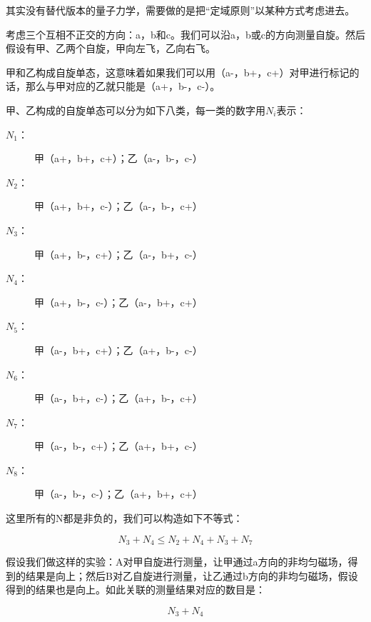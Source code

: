 其实没有替代版本的量子力学，需要做的是把“定域原则”以某种方式考虑进去。

考虑三个互相不正交的方向：a，b和c。我们可以沿a，b或c的方向测量自旋。然后假设有甲、乙两个自旋，甲向左飞，乙向右飞。

甲和乙构成自旋单态，这意味着如果我们可以用（a-，b+，c+）对甲进行标记的话，那么与甲对应的乙就只能是（a+，b-，c-）。

甲、乙构成的自旋单态可以分为如下八类，每一类的数字用$N_i$表示：

\begin{description}
\item[$N_1$：] 

甲（a+，b+，c+）；乙（a-，b-，c-）

\item[$N_2$：]

甲（a+，b+，c-）；乙（a-，b-，c+）

\item[$N_3$：]

甲（a+，b-，c+）；乙（a-，b+，c-）

\item[$N_4$：]

甲（a+，b-，c-）；乙（a-，b+，c+）

\item[$N_5$：]

甲（a-，b+，c+）；乙（a+，b-，c-）

\item[$N_6$：]

甲（a-，b+，c-）；乙（a+，b-，c+）

\item[$N_7$：]

甲（a-，b-，c+）；乙（a+，b+，c-）

\item[$N_8$：]

甲（a-，b-，c-）；乙（a+，b+，c+）

\end{description}

这里所有的N都是非负的，我们可以构造如下不等式：

\begin{equation}
N_3 + N_4 \le N_2 + N_4 + N_3 + N_7
\end{equation}

假设我们做这样的实验：A对甲自旋进行测量，让甲通过a方向的非均匀磁场，得到的结果是向上；然后B对乙自旋进行测量，让乙通过b方向的非均匀磁场，假设得到的结果也是向上。如此关联的测量结果对应的数目是：

\begin{equation}
N_3 + N_4
\end{equation}

